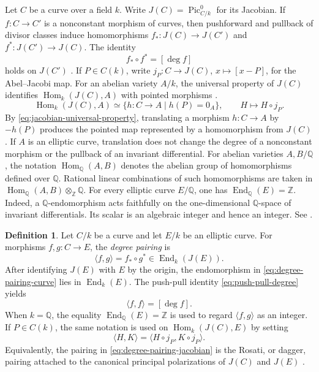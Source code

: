 \documentclass[12pt, letterpaper]{amsart}
\theoremstyle{definition}
\newtheorem{definition}[theorem]{Definition}
\theoremstyle{remark}
\newcommand{\Q}{\mathbb Q}
\newcommand{\Z}{\mathbb Z}
\newcommand{\Hom}{\operatorname{Hom}}
\newcommand{\End}{\operatorname{End}}
\numberwithin{equation}{section}
\begin{document}
Let \(C\) be a curve over a field \(k\). Write
\(J(C)=\operatorname{Pic}^0_{C/k}\) for its Jacobian. If
\(f:C\to C'\) is a nonconstant morphism of curves, then pushforward and pullback
of divisor classes induce homomorphisms \(f_*:J(C)\to J(C')\) and
\(f^*:J(C')\to J(C)\).
The identity
\begin{equation}\label{eq:push-pull-degree}
        f_*\circ f^*=[\deg f]
\end{equation}
holds on \(J(C')\) \cite{DerickxOrlic}. If \(P\in C(k)\), write
\(j_P:C\to J(C)\), \(x\mapsto [x-P]\), for the Abel--Jacobi map. For an abelian variety \(A/k\), the universal property
of $J(C)$ identifies \(\Hom_k(J(C),A)\) with pointed morphisms
\cite{MilneJacobians}.
\begin{equation}\label{eq:jacobian-universal-property}
        \Hom_k(J(C),A)\simeq
        \{h:C\to A\mid h(P)=0_A\},
        \qquad H\longmapsto H\circ j_P.
\end{equation}
By \eqref{eq:jacobian-universal-property}, translating a morphism
\(h:C\to A\) by \(-h(P)\) produces the pointed map represented by a
homomorphism from \(J(C)\). If \(A\) is an elliptic curve,
translation does not change the degree of a nonconstant morphism or the pullback
of an invariant differential.
For abelian varieties \(A,B/\Q\), the notation \(\Hom_\Q(A,B)\) denotes the
abelian group of homomorphisms defined over \(\Q\). Rational linear combinations
of such homomorphisms are taken in \(\Hom_\Q(A,B)\otimes_\Z\Q\).
For every elliptic curve \(E/\Q\), one has \(\End_\Q(E)=\Z\). Indeed, a
\(\Q\)-endomorphism acts faithfully on the one-dimensional \(\Q\)-space of
invariant differentials. Its scalar is an algebraic integer and hence an integer.
See \cite{SilvermanAEC}.

\begin{definition}\label{def:degree-pairing}
Let \(C/k\) be a curve and let \(E/k\) be an elliptic curve. For morphisms
\(f,g:C\to E\), the \emph{degree pairing} is
\begin{equation}\label{eq:degree-pairing-curve}
        \langle f,g\rangle=f_*\circ g^*\in \End_k(J(E)).
\end{equation}
After identifying \(J(E)\) with \(E\) by the origin, the endomorphism in
\eqref{eq:degree-pairing-curve} lies in \(\End_k(E)\). The push-pull identity
\eqref{eq:push-pull-degree} yields
\begin{equation}\label{eq:degree-pairing-diagonal}
        \langle f,f\rangle=[\deg f].
\end{equation}
When \(k=\Q\), the equality \(\End_\Q(E)=\Z\) is used to regard
\(\langle f,g\rangle\) as an integer. If \(P\in C(k)\), the same notation is used
on \(\Hom_k(J(C),E)\) by setting
\begin{equation}\label{eq:degree-pairing-jacobian}
        \langle H,K\rangle=\langle H\circ j_P,K\circ j_P\rangle .
\end{equation}
Equivalently, the pairing in \eqref{eq:degree-pairing-jacobian} is the Rosati,
or dagger, pairing attached to the canonical principal polarizations of \(J(C)\)
and \(J(E)\) \cite{DerickxOrlic}.
\end{definition}
\end{document}
